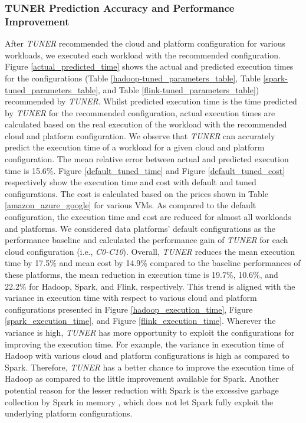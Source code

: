 \documentclass[3p]{elsarticle}
\begin{document}
\subsubsection{TUNER Prediction Accuracy and Performance Improvement} After \textit{TUNER} recommended the cloud and platform configuration for various workloads, we executed each workload with the recommended configuration. Figure \ref{actual_predicted_time} shows the actual and predicted execution times for the configurations (Table \ref{hadoop-tuned_parameters_table}, Table \ref{spark-tuned_parameters_table}, and Table \ref{flink-tuned_parameters_table}) recommended by \textit{TUNER}. Whilst predicted execution time is the time predicted by \textit{TUNER} for the recommended configuration, actual execution times are calculated based on the real execution of the workload with the recommended cloud and platform configuration. We observe that \textit{TUNER} can accurately predict the execution time of a workload for a given cloud and platform configuration. The mean relative error between actual and predicted execution time is 15.6\%.  Figure \ref{default_tuned_time} and Figure \ref{default_tuned_cost} respectively show the execution time and cost with default and tuned configurations. The cost is calculated based on the prices shown in Table \ref{amazon_azure_google} for various VMs. As compared to the default configuration, the execution time and cost are reduced for almost all workloads and platforms. We considered data platforms' default configurations as the performance baseline and calculated the performance gain of \textit{TUNER} for each cloud configuration (i.e., \textit{C0-C10}). Overall, \textit{TUNER} reduces the mean execution time by 17.5\% and mean cost by 14.9\% compared to the baseline performances of these platforms, the mean reduction in execution time is 19.7\%, 10.6\%, and 22.2\% for Hadoop, Spark, and Flink, respectively. This trend is aligned with the variance in execution time with respect to various cloud and platform configurations presented in Figure \ref{hadoop_execution_time}, Figure \ref{spark_execution_time}, and Figure \ref{flink_execution_time}. Wherever the variance is high, \textit{TUNER} has more opportunity to exploit the configurations for improving the execution time. For example, the variance in execution time of Hadoop with various cloud and platform configurations is high as compared to Spark. Therefore, \textit{TUNER} has a better chance to improve the execution time of Hadoop as compared to the little improvement available for Spark. Another potential reason for the lesser reduction with Spark is the excessive garbage collection by Spark in memory \cite{marcu2016spark}, which does not let Spark fully exploit the underlying platform configurations.
\end{document}
